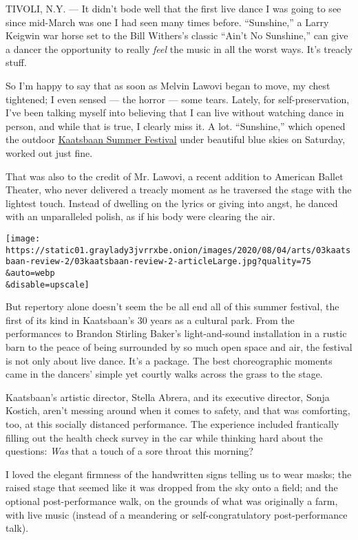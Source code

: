 TIVOLI, N.Y. --- It didn't bode well that the first live dance I was
going to see since mid-March was one I had seen many times before.
``Sunshine,'' a Larry Keigwin war horse set to the Bill Withers's
classic ``Ain't No Sunshine,'' can give a dancer the opportunity to
really \emph{feel} the music in all the worst ways. It's treacly stuff.

So I'm happy to say that as soon as Melvin Lawovi began to move, my
chest tightened; I even sensed --- the horror --- some tears. Lately,
for self-preservation, I've been talking myself into believing that I
can live without watching dance in person, and while that is true, I
clearly miss it. A lot. ``Sunshine,'' which opened the outdoor
\href{https://www.nytimes3xbfgragh.onion/2020/07/29/arts/dance/kaatsbaan-dance-festival-stella-abrera.html}{Kaatsbaan
Summer Festival} under beautiful blue skies on Saturday, worked out just
fine.

That was also to the credit of Mr. Lawovi, a recent addition to American
Ballet Theater, who never delivered a treacly moment as he traversed the
stage with the lightest touch. Instead of dwelling on the lyrics or
giving into angst, he danced with an unparalleled polish, as if his body
were clearing the air.

\texttt{[image: https://static01.graylady3jvrrxbe.onion/images/2020/08/04/arts/03kaatsbaan-review-2/03kaatsbaan-review-2-articleLarge.jpg?quality=75\\\&auto=webp\\\&disable=upscale]}

But repertory alone doesn't seem the be all end all of this summer
festival, the first of its kind in Kaatsbaan's 30 years as a cultural
park. From the performances to Brandon Stirling Baker's light-and-sound
installation in a rustic barn to the peace of being surrounded by so
much open space and air, the festival is not only about live dance. It's
a package. The best choreographic moments came in the dancers' simple
yet courtly walks across the grass to the stage.

Kaatsbaan's artistic director, Stella Abrera, and its executive
director, Sonja Kostich, aren't messing around when it comes to safety,
and that was comforting, too, at this socially distanced performance.
The experience included frantically filling out the health check survey
in the car while thinking hard about the questions: \emph{Was} that a
touch of a sore throat this morning?

I loved the elegant firmness of the handwritten signs telling us to wear
masks; the raised stage that seemed like it was dropped from the sky
onto a field; and the optional post-performance walk, on the grounds of
what was originally a farm, with live music (instead of a meandering or
self-congratulatory post-performance talk).

